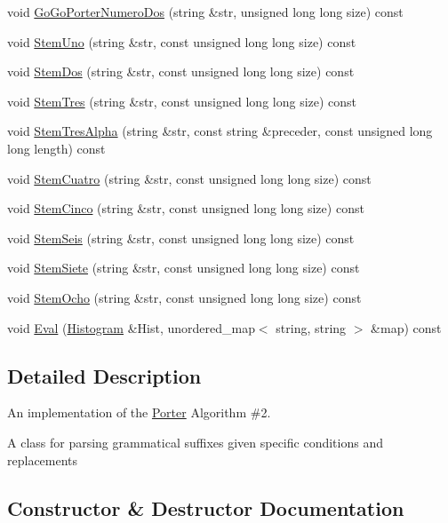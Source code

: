 \begin{DoxyCompactItemize}
\item 
void \hyperlink{class_porter_af7f1d6892ca1ed4e22986c48be2365d6}{Go\+Go\+Porter\+Numero\+Dos} (string \&str, unsigned long long size) const
\item 
void \hyperlink{class_porter_ad8b63c9741655393ff9c849d269c953a}{Stem\+Uno} (string \&str, const unsigned long long size) const
\item 
void \hyperlink{class_porter_a33838d3b5ab4963106a5c47c4a0c74e6}{Stem\+Dos} (string \&str, const unsigned long long size) const
\item 
void \hyperlink{class_porter_a4aadb1440bc5f143aba28641cab26ff6}{Stem\+Tres} (string \&str, const unsigned long long size) const
\item 
void \hyperlink{class_porter_ac5e4f3909a27316c6997c92a0019eaaf}{Stem\+Tres\+Alpha} (string \&str, const string \&preceder, const unsigned long long length) const
\item 
void \hyperlink{class_porter_aa1e1b416311f37b827bc093bb03ca500}{Stem\+Cuatro} (string \&str, const unsigned long long size) const
\item 
void \hyperlink{class_porter_a916f45b55a1bbdaff7ce1db3d9a42813}{Stem\+Cinco} (string \&str, const unsigned long long size) const
\item 
void \hyperlink{class_porter_a485f69d6797fce65144e0596f3190c2d}{Stem\+Seis} (string \&str, const unsigned long long size) const
\item 
void \hyperlink{class_porter_a1015f959403c55d740fff435f0cae439}{Stem\+Siete} (string \&str, const unsigned long long size) const
\item 
void \hyperlink{class_porter_a61853073641e47863fc6a85c786d8737}{Stem\+Ocho} (string \&str, const unsigned long long size) const
\item 
void \hyperlink{class_porter_afbe6ae10a924a4419e62a20babe3be7d}{Eval} (\hyperlink{class_histogram}{Histogram} \&Hist, unordered\+\_\+map$<$ string, string $>$ \&map) const
\end{DoxyCompactItemize}


\subsection{Detailed Description}
An implementation of the \hyperlink{class_porter}{Porter} Algorithm \#2. 

A class for parsing grammatical suffixes given specific conditions and replacements 

\subsection{Constructor \& Destructor Documentation}
\mbox{\label{class_porter_a04be3733ab5109a1cf6131de05cc5961}} 
